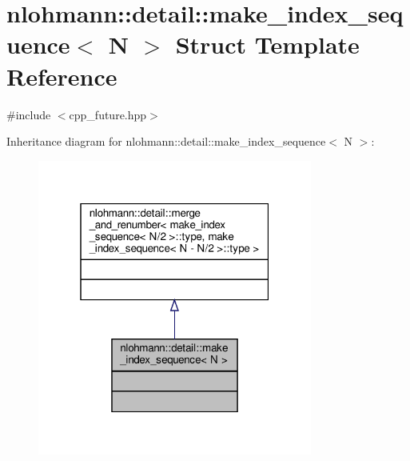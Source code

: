 \hypertarget{structnlohmann_1_1detail_1_1make__index__sequence}{}\section{nlohmann\+:\+:detail\+:\+:make\+\_\+index\+\_\+sequence$<$ N $>$ Struct Template Reference}
\label{structnlohmann_1_1detail_1_1make__index__sequence}


{\ttfamily \#include $<$cpp\+\_\+future.\+hpp$>$}



Inheritance diagram for nlohmann\+:\+:detail\+:\+:make\+\_\+index\+\_\+sequence$<$ N $>$\+:\nopagebreak
\begin{figure}[H]
\begin{center}
\leavevmode
\includegraphics[width=256pt]{structnlohmann_1_1detail_1_1make__index__sequence__inherit__graph}
\end{center}
\end{figure}


